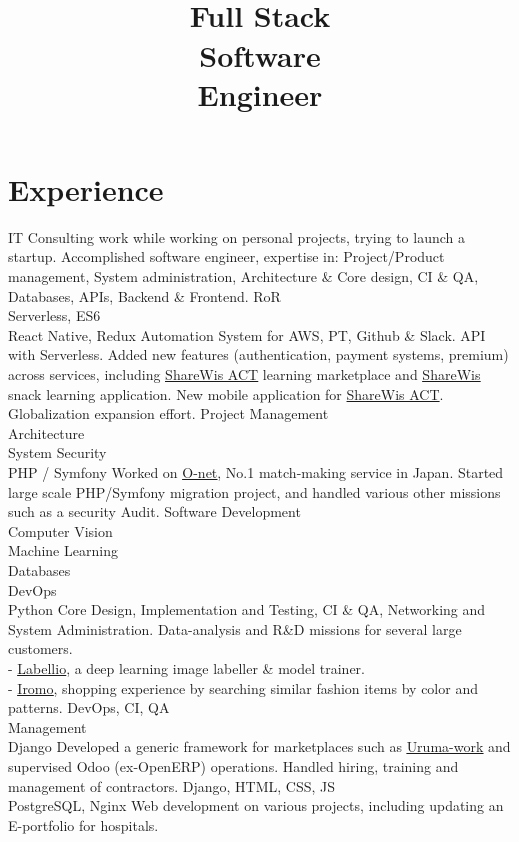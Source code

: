 \documentclass[a4paper,11pt]{cv4tw}%
\title{\\ Full Stack\\Software\\Engineer}
\begin{document}
\section{Experience}
{}
{IT Consulting work while working on personal projects, trying to launch a startup.
Accomplished software engineer, expertise in: Project/Product management, System administration,
Architecture \& Core design, CI \& QA, Databases, APIs, Backend \& Frontend.
}
{RoR\\Serverless, ES6\\React Native, Redux}
{Automation System for AWS, PT, Github \& Slack. API with Serverless. Added
new features (authentication, payment systems, premium) across services,
including \underline{\href{https://act.share-wis.com}{ShareWis ACT}} learning
marketplace and \underline{\href{https://www.share-wis.com}{ShareWis}} snack
learning application.
New mobile application for \href{https://act.share-wis.com}{ShareWis ACT}.
Globalization expansion effort.
}
{Project Management\\Architecture\\System Security\\PHP / Symfony}
{Worked on \underline{\href{http://onet.rakuten.co.jp/}{O-net}}, No.1
  match-making service in Japan. Started large scale PHP/Symfony migration
  project, and handled various other missions such as a security Audit.
}
{Software Development\\Computer Vision\\Machine Learning\\Databases\\DevOps\\Python}
{Core Design, Implementation and Testing, CI \& QA, Networking and System Administration.
Data-analysis and R\&D missions for several large customers.\\
- \underline{\href{http://www.labell.io/}{Labellio}}, a deep
    learning image labeller \& model trainer.\\
- \underline{\href{http://iromo.jp}{Iromo}}, shopping experience by
    searching similar fashion items by color and patterns.
}
{DevOps, CI, QA\\Management\\Django}
{Developed a generic framework for marketplaces such as
  \underline{\href{https://uruma-work.com}{Uruma-work}} and supervised Odoo
  (ex-OpenERP) operations. Handled hiring, training and management of
  contractors.
}
{Django, HTML, CSS, JS\\PostgreSQL, Nginx}
{Web development on various projects, including updating an E-portfolio for
hospitals.
}
\end{document}

